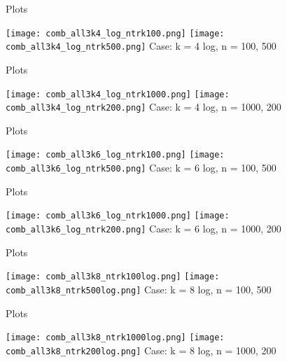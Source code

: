 \documentclass[aspectratio=169,compress,10pt]{beamer} %
\begin{document}
\begin{frame}{Plots}
\begin{adjustwidth}{-2em}{-2em}
\texttt{[image: comb\_all3k4\_log\_ntrk100.png]}
\texttt{[image: comb\_all3k4\_log\_ntrk500.png]}
Case: k = 4 log, n = 100, 500
\end{adjustwidth}
\end{frame}

\begin{frame}{Plots}
\begin{adjustwidth}{-2em}{-2em}
\texttt{[image: comb\_all3k4\_log\_ntrk1000.png]}
\texttt{[image: comb\_all3k4\_log\_ntrk200.png]}
Case: k = 4 log, n = 1000, 200
\end{adjustwidth}
\end{frame}

\begin{frame}{Plots}
\begin{adjustwidth}{-2em}{-2em}
\texttt{[image: comb\_all3k6\_log\_ntrk100.png]}
\texttt{[image: comb\_all3k6\_log\_ntrk500.png]}
Case: k = 6 log, n = 100, 500
\end{adjustwidth}
\end{frame}

\begin{frame}{Plots}
\begin{adjustwidth}{-2em}{-2em}
\texttt{[image: comb\_all3k6\_log\_ntrk1000.png]}
\texttt{[image: comb\_all3k6\_log\_ntrk200.png]}
Case: k = 6 log, n = 1000, 200
\end{adjustwidth}
\end{frame}

\begin{frame}{Plots}
\begin{adjustwidth}{-2em}{-2em}
\texttt{[image: comb\_all3k8\_ntrk100log.png]}
\texttt{[image: comb\_all3k8\_ntrk500log.png]}
Case: k = 8 log, n = 100, 500
\end{adjustwidth}
\end{frame}

\begin{frame}{Plots}
\begin{adjustwidth}{-2em}{-2em}
\texttt{[image: comb\_all3k8\_ntrk1000log.png]}
\texttt{[image: comb\_all3k8\_ntrk200log.png]}
Case: k = 8 log, n = 1000, 200
\end{adjustwidth}
\end{frame}
\end{document}
